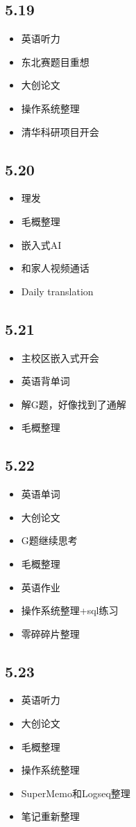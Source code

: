 \documentclass[UTF8]{ctexart}
\begin{document}
\subsection*{5.19}
\begin{itemize}
    \item 英语听力
    \item 东北赛题目重想
    \item 大创论文
    \item 操作系统整理
    \item 清华科研项目开会
\end{itemize}
\subsection*{5.20}
\begin{itemize}
    \item 理发
    \item 毛概整理
    \item 嵌入式AI
    \item 和家人视频通话
    \item Daily translation
\end{itemize}
\subsection*{5.21}
\begin{itemize}
    \item 主校区嵌入式开会
    \item 英语背单词
    \item 解G题，好像找到了通解
    \item 毛概整理
\end{itemize}
\subsection*{5.22}
\begin{itemize}
    \item 英语单词
    \item 大创论文
    \item G题继续思考
    \item 毛概整理
    \item 英语作业
    \item 操作系统整理+sql练习
    \item 零碎碎片整理
\end{itemize}
\subsection*{5.23}
\begin{itemize}
    \item 英语听力
    \item 大创论文
    \item 毛概整理
    \item 操作系统整理
    \item SuperMemo和Logseq整理
    \item 笔记重新整理
\end{itemize}
\end{document}

